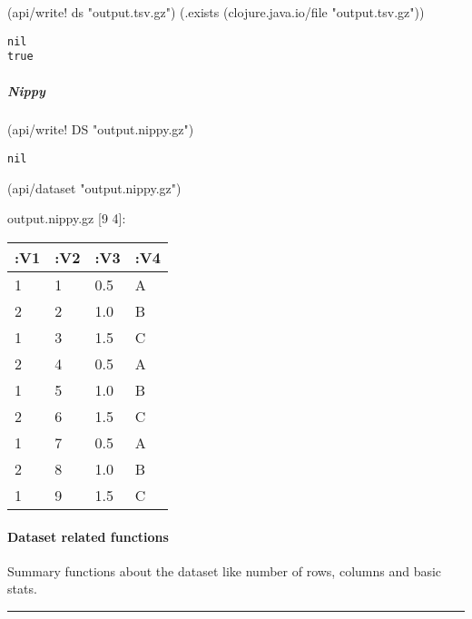 \documentclass[]{article}
\newenvironment{Shaded}{\begin{snugshade}}{\end{snugshade}}
\newcommand{\NormalTok}[1]{#1}
\newcommand{\StringTok}[1]{\textcolor[rgb]{0.31,0.60,0.02}{#1}}
\let\oldparagraph\paragraph
\renewcommand{\paragraph}[1]{\oldparagraph{#1}\mbox{}}
\let\oldsubparagraph\subparagraph
\renewcommand{\subparagraph}[1]{\oldsubparagraph{#1}\mbox{}}
\begin{document}
\begin{Shaded}
\begin{Highlighting}[]
\NormalTok{(api/write! ds }\StringTok{"output.tsv.gz"}\NormalTok{)}
\NormalTok{(.exists (clojure.java.io/file }\StringTok{"output.tsv.gz"}\NormalTok{))}
\end{Highlighting}
\end{Shaded}

\begin{verbatim}
nil
true
\end{verbatim}

\hypertarget{nippy}{%
\subparagraph{Nippy}\label{nippy}}

\begin{Shaded}
\begin{Highlighting}[]
\NormalTok{(api/write! DS }\StringTok{"output.nippy.gz"}\NormalTok{)}
\end{Highlighting}
\end{Shaded}

\begin{verbatim}
nil
\end{verbatim}

\begin{Shaded}
\begin{Highlighting}[]
\NormalTok{(api/dataset }\StringTok{"output.nippy.gz"}\NormalTok{)}
\end{Highlighting}
\end{Shaded}

output.nippy.gz {[}9 4{]}:

\begin{longtable}[]{@{}llll@{}}
\toprule
:V1 & :V2 & :V3 & :V4\tabularnewline
\midrule
\endhead
1 & 1 & 0.5 & A\tabularnewline
2 & 2 & 1.0 & B\tabularnewline
1 & 3 & 1.5 & C\tabularnewline
2 & 4 & 0.5 & A\tabularnewline
1 & 5 & 1.0 & B\tabularnewline
2 & 6 & 1.5 & C\tabularnewline
1 & 7 & 0.5 & A\tabularnewline
2 & 8 & 1.0 & B\tabularnewline
1 & 9 & 1.5 & C\tabularnewline
\bottomrule
\end{longtable}

\hypertarget{dataset-related-functions}{%
\paragraph{Dataset related functions}\label{dataset-related-functions}}

Summary functions about the dataset like number of rows, columns and
basic stats.

\begin{center}\rule{0.5\linewidth}{0.5pt}\end{center}
\end{document}

